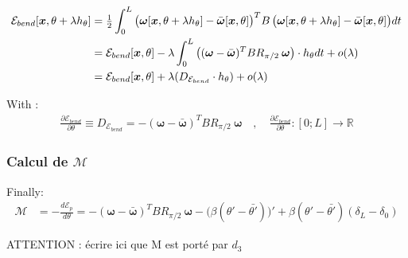 \begin{align}
	\mathcal{E}_{bend}[\boldsymbol{x},\theta + \lambda h_{\theta}]
		& = \tfrac{1}{2} \int_{0}^{L} \big(\boldsymbol{\omega}[\boldsymbol{x}, \theta + \lambda h_{\theta}] - \bar{\boldsymbol{\omega}}[\boldsymbol{x}, \theta]\big)^T B \,  \big(\boldsymbol{\omega}[\boldsymbol{x}, \theta + \lambda h_{\theta}] - \bar{\boldsymbol{\omega}}[\boldsymbol{x}, \theta]\big)dt \notag\\
		& = \mathcal{E}_{bend}[\boldsymbol{x},\theta] - \lambda \int_{0}^{L} \big((\boldsymbol{\omega} - \bar{\boldsymbol{\omega}})^T B R_{\pi/2}\:\boldsymbol{\omega}\big)\cdot h_{\theta} dt + o(\lambda) \notag\\
		& =  \mathcal{E}_{bend}[\boldsymbol{x},\theta] + \lambda(D_{\mathcal{E}_{bend}} \cdot h_{\theta}) + o(\lambda)
\end{align}

With :
\begin{align}
	\frac{\partial \mathcal{E}_{bend}}{\partial \theta} \equiv D_{\mathcal{E}_{bend}} = -(\boldsymbol{\omega} - \bar{\boldsymbol{\omega}})^T B R_{\pi/2}\:\boldsymbol{\omega}
	\quad , \quad \frac{\partial \mathcal{E}_{bend}}{\partial \theta} : [0;L] \longrightarrow \mathbb{R}
\end{align}


\subsubsection{Calcul de $\mathcal{M}$}

Finally:
\begin{align}
\mathcal{M} 	& = -\frac{d\mathcal{E}_p}{d\theta} = -(\boldsymbol{\omega} - \bar{\boldsymbol{\omega}})^T B R_{\pi/2}\:\boldsymbol{\omega} - \big(\beta(\theta'-{\bar{\theta'}})\big)' + \beta(\theta'-{\bar{\theta'}})(\delta_L-\delta_0)
\end{align}

ATTENTION : écrire ici que M est porté par $d_3$


